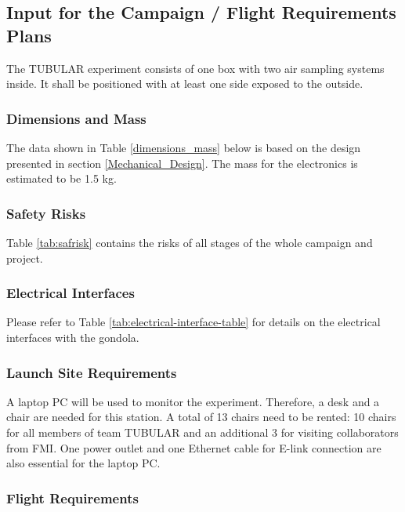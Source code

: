 \subsection{Input for the Campaign / Flight Requirements Plans}

The TUBULAR experiment consists of one box with two air sampling systems inside. It shall be positioned with at least one side exposed to the outside.

\subsubsection{Dimensions and Mass}

The data shown in Table \ref{dimensions_mass} below is based on the design presented in section \ref{Mechanical_Design}.  The mass for the electronics is estimated to be 1.5 kg.  



\subsubsection{Safety Risks}
Table \ref{tab:safrisk} contains the risks of all stages of the whole campaign and project.


\pagebreak
\subsubsection{Electrical Interfaces}

Please refer to Table \ref{tab:electrical-interface-table} for details on the electrical interfaces with the gondola.



\subsubsection{Launch Site Requirements}
A laptop PC will be used to monitor the experiment. Therefore, a desk and a chair are needed for this station. A total of 13 chairs need to be rented: 10 chairs for all members of team TUBULAR and an additional 3 for visiting collaborators from FMI. One power outlet and one Ethernet cable for E-link connection are also essential for the laptop PC.

\subsubsection{Flight Requirements}

